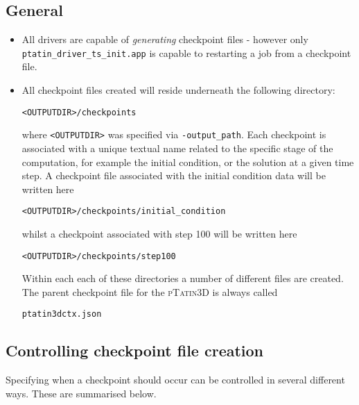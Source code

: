 \documentclass[paper=a4, fontsize=10pt,twoside]{scrartcl}
\newcommand{\ptat}{{{\textsc{pTatin3D}}}}
\begin{document}
\subsection{General}
\begin{itemize}
\item All drivers are capable of \textit{generating} checkpoint files - however only {\tt ptatin\_driver\_ts\_init.app} is
capable to restarting a job from a checkpoint file.

\item All checkpoint files created will reside underneath the following directory:
\begin{lstlisting}
<OUTPUTDIR>/checkpoints
\end{lstlisting}
where {\tt <OUTPUTDIR>} was specified via {\tt -output\_path}.
Each checkpoint is associated with a unique textual name related to the specific stage of the computation, for example
the initial condition, or the solution at a given time step.
A checkpoint file associated with the initial condition data will be written here
\begin{lstlisting}
<OUTPUTDIR>/checkpoints/initial_condition
\end{lstlisting}
whilst a checkpoint associated with step 100 will be written here
\begin{lstlisting}
<OUTPUTDIR>/checkpoints/step100
\end{lstlisting}
Within each each of these directories a number of different files are created.
The parent checkpoint file for the {\ptat} is always called
\begin{lstlisting}
ptatin3dctx.json
\end{lstlisting}
\end{itemize}

\subsection{Controlling checkpoint file creation}
Specifying when a checkpoint should occur can be controlled in several different ways.
These are summarised below.
\end{document}
